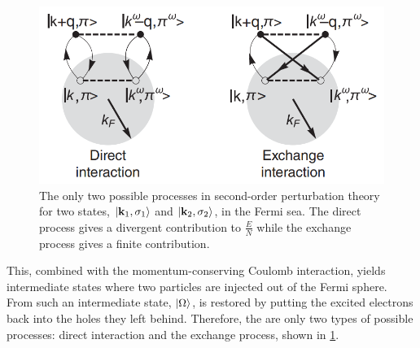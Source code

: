 \begin{figure}
    \centering
    \includegraphics[scale = .5]{figs/Jellium model/fermi_sea_loops_second_order.png}
    \caption{The only two possible processes in second-order perturbation theory for two states, $\ket{{\bf k}_1, \sigma_1}$ and $\ket{{\bf k}_2, \sigma_2}$, in the Fermi sea. The direct process gives a divergent contribution to $\frac{E}{N}$ while the exchange process gives a finite contribution.}
    \label{fig:fermi_sea_loops_second_order}
\end{figure}

This, combined with the momentum-conserving Coulomb interaction, yields intermediate states where two particles are injected out of the Fermi sphere. From such an intermediate state, $\ket{\Omega}$, is restored by putting the excited electrons back into the holes they left behind. Therefore, the are only two types of possible processes: direct interaction and the exchange process, shown in \cref{fig:fermi_sea_loops_second_order}. \\

